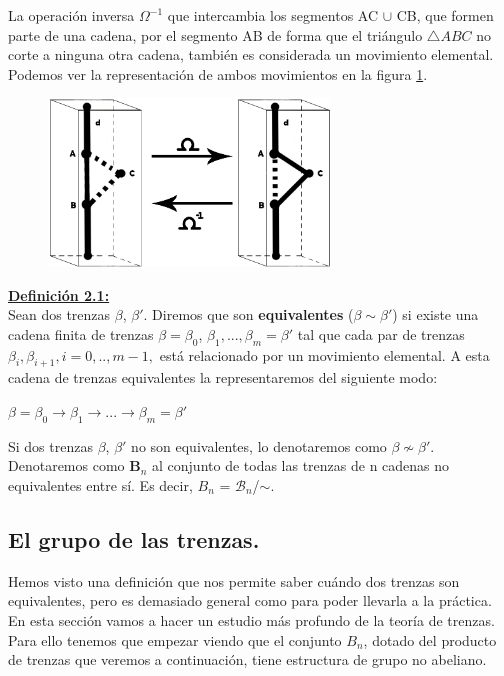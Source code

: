 \documentclass[14pt]{extarticle}
\begin{document}
La operación inversa $ \Omega^{-1} $ que intercambia los segmentos AC $\cup$  CB, que formen parte de una cadena, por el segmento AB de forma que el triángulo $\triangle ABC$ no corte a ninguna otra cadena, también es considerada un movimiento elemental. \\
Podemos ver la representación de ambos movimientos en la figura \ref{elem}.\\
\begin{figure}[h!]
	\centering
	\includegraphics[width=7.5cm]{itrenzas/elemental.png}
	\caption{}
	\label{elem} 
\end{figure}


\textbf{\underline{Definición 2.1:}}\label{defequi}\\
Sean dos trenzas $\beta$, $\beta'$. Diremos que son \textbf{equivalentes} ($\beta \sim \beta'$) si existe una cadena finita de trenzas $ \beta = \beta_{0}$, $\beta_{1},...,\beta_{m}=\beta'$ tal que cada par de trenzas $ \beta_{i}, \beta_{i+1}, i=0,..,m-1, $ está relacionado por un movimiento elemental. A esta cadena de trenzas equivalentes la representaremos del siguiente modo:
\begin{center}
	$ \beta = \beta_{0} \rightarrow \beta_{1} \rightarrow ... \rightarrow \beta_{m}=\beta'$
\end{center}

Si dos trenzas $\beta$, $\beta'$ no son equivalentes, lo denotaremos como $\beta \not \sim \beta'$.\\

Denotaremos como $ \textbf{B}_{n} $ al conjunto de todas las trenzas de n cadenas no equivalentes entre sí. Es decir, ${B}_{n}$ = $\mathscr{B}_{n}$/$ \sim $.\\

\newpage
\subsection{El grupo de las trenzas.}
Hemos visto una definición que nos permite saber cuándo dos trenzas son equivalentes, pero es demasiado general como para poder llevarla a la práctica. En esta sección vamos a hacer un estudio más profundo de la teoría de trenzas. Para ello tenemos que empezar viendo que el conjunto ${B}_{n}$, dotado del producto de trenzas que veremos a continuación, tiene estructura de grupo no abeliano.
\end{document}
